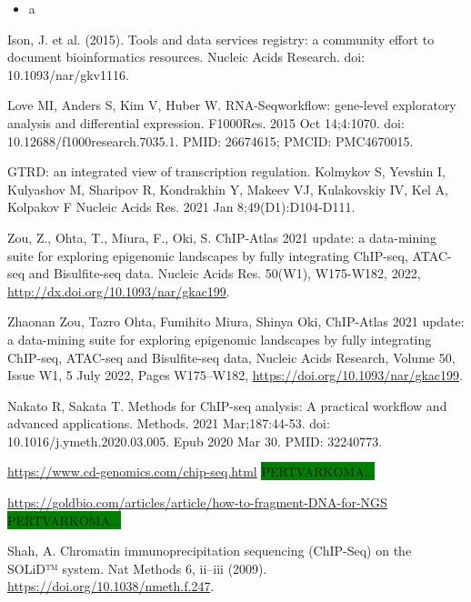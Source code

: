 \documentclass[12pt]{article}
\begin{document}
\begin{itemize}
    \item a
\end{itemize}

\newpage



\begin{thebibliography}{99}

 Ison, J. et al. (2015). Tools and data services registry: a
community effort to document bioinformatics resources. Nucleic Acids Research.
doi: 10.1093/nar/gkv1116.

 Love MI, Anders S, Kim V, Huber W. RNA-Seqworkflow:
gene-level exploratory analysis and differential expression. F1000Res.
2015 Oct 14;4:1070. doi: 10.12688/f1000research.7035.1. PMID: 26674615;
PMCID: PMC4670015.

 GTRD: an integrated view of transcription regulation.
Kolmykov S, Yevshin I, Kulyashov M, Sharipov R, Kondrakhin Y, Makeev VJ,
Kulakovskiy IV, Kel A, Kolpakov F Nucleic Acids Res. 2021 Jan
8;49(D1):D104-D111.

 Zou, Z., Ohta, T., Miura, F., Oki, S. ChIP-Atlas 2021
update: a data-mining suite for exploring epigenomic landscapes by fully
integrating ChIP-seq, ATAC-seq and Bisulfite-seq data. Nucleic Acids Res.
50(W1), W175-W182, 2022, \newline
\url{http://dx.doi.org/10.1093/nar/gkac199}.

 Zhaonan Zou, Tazro Ohta, Fumihito Miura, Shinya Oki,
ChIP-Atlas 2021 update: a data-mining suite for exploring epigenomic landscapes
by fully integrating ChIP-seq, ATAC-seq and Bisulfite-seq data, Nucleic Acids
Research, Volume 50, Issue W1, 5 July 2022, Pages W175–W182,
\url{https://doi.org/10.1093/nar/gkac199}.

 Nakato R, Sakata T. Methods for ChIP-seq analysis: A
practical workflow and advanced applications. Methods. 2021 Mar;187:44-53.
doi: 10.1016/j.ymeth.2020.03.005. Epub 2020 Mar 30. PMID: 32240773.

 \url{https://www.cd-genomics.com/chip-seq.html}
\colorbox{green}{PERTVARKOMA...}

\url{https://goldbio.com/articles/article/how-to-fragment-DNA-for-NGS}
\colorbox{green}{PERTVARKOMA...}

 Shah, A. Chromatin immunoprecipitation sequencing (ChIP-Seq)
on the SOLiD™ system. Nat Methods 6, ii–iii (2009).
\url{https://doi.org/10.1038/nmeth.f.247}.


\end{thebibliography}
\end{document}
